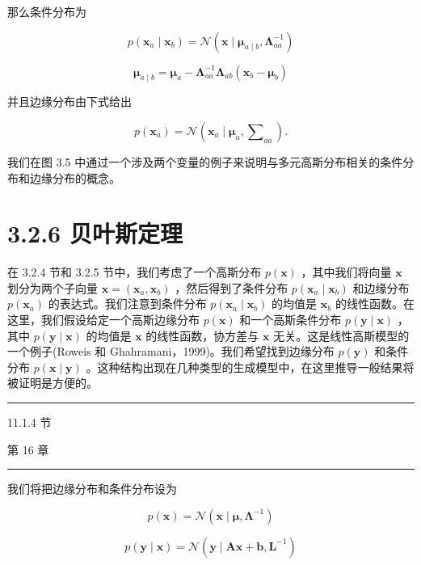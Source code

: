 \documentclass[10pt]{report}
\newcommand{\HRule}{\begin{center}\rule{0.9\linewidth}{0.2mm}\end{center}}
\begin{document}
那么条件分布为

\[
p\left( {{\mathbf{x}}_{a} \mid  {\mathbf{x}}_{b}}\right)  = \mathcal{N}\left( {\mathbf{x} \mid  {\mathbf{\mu }}_{a \mid  b},{\mathbf{\Lambda }}_{aa}^{-1}}\right)  \tag{3.80}
\]

\[
{\mathbf{\mu }}_{a \mid  b} = {\mathbf{\mu }}_{a} - {\mathbf{\Lambda }}_{aa}^{-1}{\mathbf{\Lambda }}_{ab}\left( {{\mathbf{x}}_{b} - {\mathbf{\mu }}_{b}}\right)  \tag{3.81}
\]

并且边缘分布由下式给出

\[
p\left( {\mathbf{x}}_{a}\right)  = \mathcal{N}\left( {{\mathbf{x}}_{a} \mid  {\mathbf{\mu }}_{a},{\mathbf{\sum }}_{aa}}\right) . \tag{3.82}
\]

我们在图 3.5 中通过一个涉及两个变量的例子来说明与多元高斯分布相关的条件分布和边缘分布的概念。

\section*{3.2.6 贝叶斯定理}

在 3.2.4 节和 3.2.5 节中，我们考虑了一个高斯分布 \(p\left( \mathbf{x}\right)\) ，其中我们将向量 \(\mathbf{x}\) 划分为两个子向量 \(\mathbf{x} = \left( {{\mathbf{x}}_{a},{\mathbf{x}}_{b}}\right)\) ，然后得到了条件分布 \(p\left( {{\mathbf{x}}_{a} \mid  {\mathbf{x}}_{b}}\right)\) 和边缘分布 \(p\left( {\mathbf{x}}_{a}\right)\) 的表达式。我们注意到条件分布 \(p\left( {{\mathbf{x}}_{a} \mid  {\mathbf{x}}_{b}}\right)\) 的均值是 \({\mathbf{x}}_{b}\) 的线性函数。在这里，我们假设给定一个高斯边缘分布 \(p\left( \mathbf{x}\right)\) 和一个高斯条件分布 \(p\left( {\mathbf{y} \mid  \mathbf{x}}\right)\) ，其中 \(p\left( {\mathbf{y} \mid  \mathbf{x}}\right)\) 的均值是 \(\mathbf{x}\) 的线性函数，协方差与 \(\mathbf{x}\) 无关。这是线性高斯模型的一个例子(Roweis 和 Ghahramani，1999)。我们希望找到边缘分布 \(p\left( \mathbf{y}\right)\) 和条件分布 \(p\left( {\mathbf{x} \mid  \mathbf{y}}\right)\) 。这种结构出现在几种类型的生成模型中，在这里推导一般结果将被证明是方便的。

\HRule

11.1.4 节

第 16 章

\HRule

我们将把边缘分布和条件分布设为

\[
p\left( \mathbf{x}\right)  = \mathcal{N}\left( {\mathbf{x} \mid  \mathbf{\mu },{\mathbf{\Lambda }}^{-1}}\right)  \tag{3.83}
\]

\[
p\left( {\mathbf{y} \mid  \mathbf{x}}\right)  = \mathcal{N}\left( {\mathbf{y} \mid  \mathbf{A}\mathbf{x} + \mathbf{b},{\mathbf{L}}^{-1}}\right)  \tag{3.84}
\]
\end{document}
